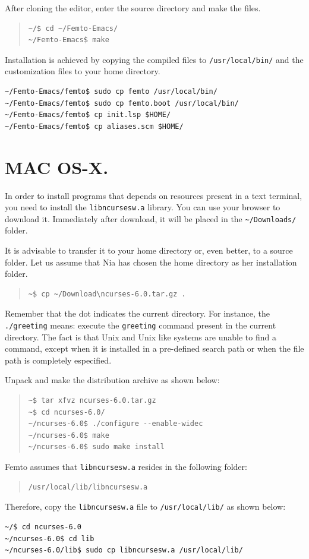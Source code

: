 \documentclass[a4paper,12pt]{book}
\begin{document}
After cloning the editor, enter the source directory
and make the files.
\begin{quote}
\begin{verbatim}
~/$ cd ~/Femto-Emacs/ 
~/Femto-Emacs$ make
\end{verbatim}
\end{quote}
Installation is achieved by copying the
compiled files to \verb|/usr/local/bin/| and
the customization files to your home directory.
\begin{verbatim}
~/Femto-Emacs/femto$ sudo cp femto /usr/local/bin/ 
~/Femto-Emacs/femto$ sudo cp femto.boot /usr/local/bin/ 
~/Femto-Emacs/femto$ cp init.lsp $HOME/ 
~/Femto-Emacs/femto$ cp aliases.scm $HOME/
\end{verbatim}


  
\section{MAC OS-X.}
In order to install programs that depends
on resources present in a text terminal,
you need to install the
\verb|libncursesw.a| library. You can
use your browser to download it.
Immediately after download, it will be
placed in the \verb|~/Downloads/| folder.

It is advisable to transfer it to your
home directory or, even better, to a
source folder. Let us assume that Nia
has chosen the home directory as her
installation folder.
\begin{quote}
\begin{verbatim}
~$ cp ~/Download\ncurses-6.0.tar.gz .
\end{verbatim}
\end{quote}
Remember that the dot indicates the current
directory. For instance, the \verb|./greeting|
means: execute the \verb|greeting| command
present in the current directory.
The fact is that Unix and Unix like systems
are unable to find a command, except when
it is installed in a pre-defined search
path or when the file path is completely
especified.

 Unpack and make the distribution archive as shown below:
\begin{quote}
\begin{verbatim}
~$ tar xfvz ncurses-6.0.tar.gz
~$ cd ncurses-6.0/
~/ncurses-6.0$ ./configure --enable-widec
~/ncurses-6.0$ make
~/ncurses-6.0$ sudo make install
\end{verbatim}
\end{quote}
Femto assumes that  \verb|libncursesw.a|
resides in the following folder:
\begin{quote}
\begin{verbatim}
/usr/local/lib/libncursesw.a 
\end{verbatim}
\end{quote}
Therefore, copy the \verb|libncursesw.a| file
to \verb|/usr/local/lib/| as shown below:
\begin{verbatim}
~/$ cd ncurses-6.0 
~/ncurses-6.0$ cd lib 
~/ncurses-6.0/lib$ sudo cp libncursesw.a /usr/local/lib/
\end{verbatim}
\end{document}
